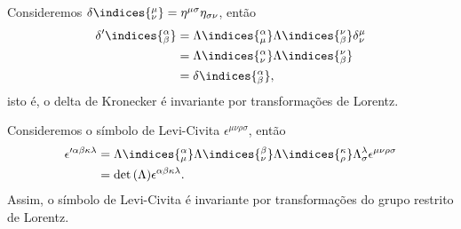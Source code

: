 Consideremos \(\delta\indices{^\mu_\nu} = \eta^{\mu \sigma}\eta_{\sigma \nu}\), então
\begin{align*}
    {\delta'}\indices{^\alpha_\beta} &= \Lambda\indices{^\alpha_\mu}\Lambda\indices{_\beta^\nu}\delta{^\mu_\nu}\\
                                     &= \Lambda\indices{^\alpha_\nu}\Lambda\indices{_\beta^\nu}\\
                                     &= \delta\indices{^\alpha_\beta},
\end{align*}
isto é, o delta de Kronecker é invariante por transformações de Lorentz.

Consideremos o símbolo de Levi-Civita \(\epsilon^{\mu\nu\rho\sigma}\), então
\begin{align*}
    \epsilon'^{\alpha \beta \kappa \lambda} &= \Lambda\indices{^\alpha_\mu}\Lambda\indices{^\beta_\nu}\Lambda\indices{^\kappa_\rho}\Lambda{^\lambda_\sigma} \epsilon^{\mu\nu\rho\sigma}\\
                                            &= \det{(\Lambda)} \epsilon^{\alpha \beta \kappa \lambda}.
\end{align*}
Assim, o símbolo de Levi-Civita é invariante por transformações do grupo restrito de Lorentz.
